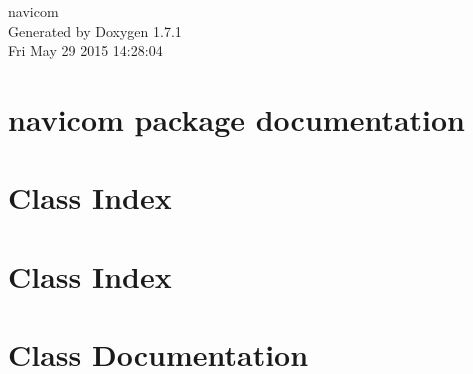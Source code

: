 \documentclass[a4paper]{article}
\begin{document}
\hypersetup{pageanchor=false}
\begin{titlepage}
\vspace*{7cm}
\begin{center}
{\Large navicom }\\
\vspace*{1cm}
{\large Generated by Doxygen 1.7.1}\\
\vspace*{0.5cm}
{\small Fri May 29 2015 14:28:04}\\
\end{center}
\end{titlepage}
\tableofcontents
{}
\hypersetup{pageanchor=true}
\section{navicom package documentation}
\label{index}\hypertarget{index}{}
\section{Class Index}

\section{Class Index}

\section{Class Documentation}





\printindex
\end{document}

